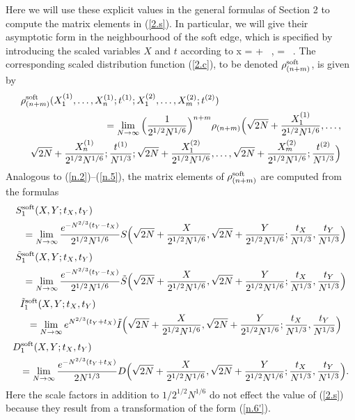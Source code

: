 Here we will use these explicit 
values in the general formulas of Section 2 to compute the 
matrix elements in (\ref{2.s}). 
In particular, we will give their asymptotic form 
in the 
neighbourhood of the soft edge, which is specified by introducing the scaled 
variables $X$ and $t$ according to 
\beqa
x =  + 
\, , \quad \quad \tau = \,   .
\label{4.6}
\eeqa
The corresponding scaled distribution function (\ref{2.c}), to be denoted
$\rho_{(n+m)}^{\rm soft}$, is given by
\begin{eqnarray}\lefteqn{\rho_{(n+m)}^{\rm soft}(X_1^{(1)},\dots,X_n^{(1)};
t^{(1)};X_1^{(2)},\dots,X_m^{(2)};t^{(2)})} \nonumber \\ &&
= \lim_{N \to \infty}
\Big ( {1 \over 2^{1/2} N^{1/6}} \Big )^{n+m} \rho_{(n+m)}\Big ( \sqrt{2N} +
 {X_1^{(1)} \over 2^{1/2} N^{1/6}}, \dots,
\label{r.1}\nonumber \\ &&
\sqrt{2N} + {X_n^{(1)} \over 2^{1/2}N^{1/6}}; {t^{(1)} \over N^{1/3}};
\sqrt{2N} + {X_1^{(2)} \over 2^{1/2} N^{1/6}}, \dots,
\sqrt{2N} + {X_m^{(2)} \over 2^{1/2} N^{1/6}}; {t^{(2)} \over N^{1/3}} \Big )
\end{eqnarray}
Analogous to (\ref{n.2})--(\ref{n.5}), the matrix elements of
$\rho_{(n+m)}^{\rm soft}$ are computed from the formulas
\begin{eqnarray}\lefteqn{
S_1^{\rm soft}(X,Y;t_X,t_Y)} \nonumber \\ && =  \lim_{N \to \infty}
{e^{-N^{2/3}(t_Y - t_X)} \over 2^{1/2} N^{1/6}}
S \Big ( \sqrt{2N} + {X \over 2^{1/2} N^{1/6}},
 \sqrt{2N} + {Y \over 2^{1/2} N^{1/6}}; {t_X \over N^{1/3}},
 {t_Y \over N^{1/3}} \Big ) \label{r.2}
\end{eqnarray}
\begin{eqnarray}\lefteqn{ 
\tilde{S}_1^{\rm soft}(X,Y;t_X,t_Y)} \nonumber \\ &&  =  \lim_{N \to \infty}
{e^{-N^{2/3}(t_Y - t_X)} \over 2^{1/2} N^{1/6}}
\tilde{S} \Big ( \sqrt{2N} + {X \over 2^{1/2} N^{1/6}},
 \sqrt{2N} + {Y \over 2^{1/2} N^{1/6}}; {t_X \over N^{1/3}},
  {t_Y \over N^{1/3}} \Big ) \label{r.3}
\end{eqnarray}
\begin{eqnarray}\lefteqn{ 
\tilde{I}_1^{\rm soft}(X,Y;t_X,t_Y)} \nonumber \\ &&  =  \lim_{N \to \infty}
e^{N^{2/3}(t_Y + t_X)} \tilde{I} \Big ( \sqrt{2N} + {X \over 2^{1/2}
N^{1/6}},
 \sqrt{2N} + {Y \over 2^{1/2} N^{1/6}}; {t_X \over N^{1/3}},
   {t_Y \over N^{1/3}} \Big ) \label{r.4} 
\end{eqnarray}
\begin{eqnarray}\lefteqn{
D_1^{\rm soft}(X,Y;t_X,t_Y)} \nonumber \\ & & = \lim_{N \to \infty}  
{e^{-N^{2/3}(t_Y + t_X)} 
 \over 2 N^{1/3}}
D \Big ( \sqrt{2N} + {X \over 2^{1/2}
N^{1/6}},
 \sqrt{2N} + {Y \over 2^{1/2} N^{1/6}}; {t_X \over N^{1/3}},
{t_Y \over N^{1/3}} \Big ). \label{r.5}
\end{eqnarray}
Here the scale factors in addition to $1/2^{1/2} N^{1/6}$ do not effect
the value of (\ref{2.s}) because they result from a transformation of the
form (\ref{n.6'}).

